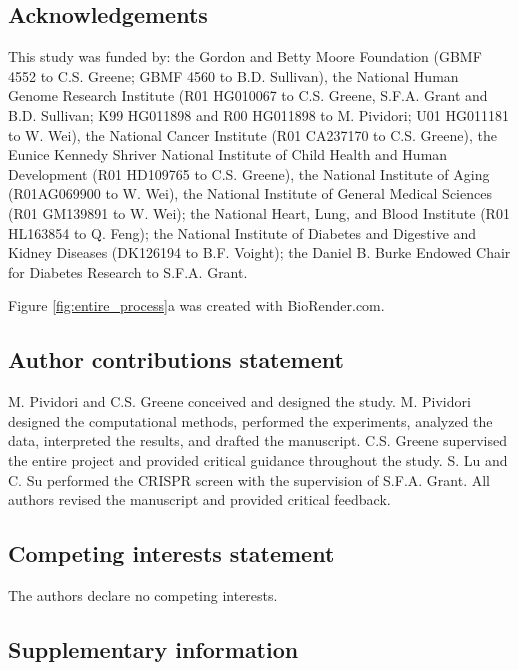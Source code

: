 \documentclass[
  a4paper,
]{article}
\begin{document}
\hypertarget{acknowledgements}{%
\subsection{Acknowledgements}\label{acknowledgements}}

This study was funded by:
the Gordon and Betty Moore Foundation (GBMF 4552 to C.S. Greene; GBMF 4560 to B.D. Sullivan),
the National Human Genome Research Institute (R01 HG010067 to C.S. Greene, S.F.A. Grant and B.D. Sullivan; K99 HG011898 and R00 HG011898 to M. Pividori; U01 HG011181 to W. Wei),
the National Cancer Institute (R01 CA237170 to C.S. Greene),
the Eunice Kennedy Shriver National Institute of Child Health and Human Development (R01 HD109765 to C.S. Greene),
the National Institute of Aging (R01AG069900 to W. Wei),
the National Institute of General Medical Sciences (R01 GM139891 to W. Wei);
the National Heart, Lung, and Blood Institute (R01 HL163854 to Q. Feng);
the National Institute of Diabetes and Digestive and Kidney Diseases (DK126194 to B.F. Voight);
the Daniel B. Burke Endowed Chair for Diabetes Research to S.F.A. Grant.

Figure \ref{fig:entire_process}a was created with BioRender.com.

\hypertarget{author-contributions-statement}{%
\subsection{Author contributions statement}\label{author-contributions-statement}}

M. Pividori and C.S. Greene conceived and designed the study.
M. Pividori designed the computational methods, performed the experiments, analyzed the data, interpreted the results, and drafted the manuscript.
C.S. Greene supervised the entire project and provided critical guidance throughout the study.
S. Lu and C. Su performed the CRISPR screen with the supervision of S.F.A. Grant.
All authors revised the manuscript and provided critical feedback.

\hypertarget{competing-interests-statement}{%
\subsection{Competing interests statement}\label{competing-interests-statement}}

The authors declare no competing interests.

\clearpage

\hypertarget{supplementary-information}{%
\subsection{Supplementary information}\label{supplementary-information}}
\end{document}
